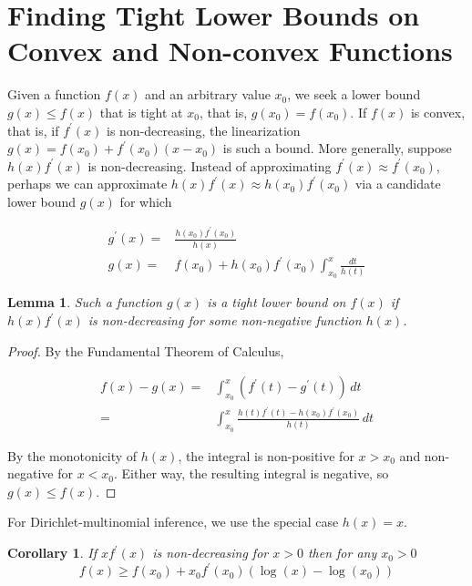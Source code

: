 \documentclass[nofootinbib,amssymb,amsmath]{revtex4}
\newtheorem{lemma}{Lemma}
\newtheorem{corollary}{Corollary}
\begin{document}
\section{Finding Tight Lower Bounds on Convex and Non-convex Functions} \label{bounds}

Given a function $f(x)$ and an arbitrary value $x_0$, we seek a lower bound $g(x) \le f(x)$ that is tight at $x_0$, that is, $g(x_0) = f(x_0)$.  If $f(x)$ is convex, that is, if $f^\prime(x)$ is non-decreasing, the linearization $g(x) = f(x_0) + f^\prime(x_0)(x-x_0)$ is such a bound.  More generally, suppose $h(x) f^\prime(x)$ is non-decreasing.  Instead of approximating $f^\prime(x) \approx f^\prime(x_0)$, perhaps we can approximate $h(x) f^\prime(x) \approx h(x_0) f^\prime(x_0)$ via a candidate lower bound $g(x)$ for which

\begin{align}
g^\prime(x) =& \frac{ h(x_0) f^\prime(x_0) } {h(x)} \\
g(x) =& f(x_0) + h(x_0) f^\prime(x_0)  \int_{x_0}^x \frac{d t}{h(t)}
\end{align}

\begin{lemma}
Such a function $g(x)$ is a tight lower bound on $f(x)$ if $h(x) f^\prime(x)$ is non-decreasing for some non-negative function $h(x)$.
\end{lemma}

\begin{proof}
By the Fundamental Theorem of Calculus,

\begin{align}
f(x) - g(x) =& \int_{x_0}^{x} \left( f^\prime(t) - g^\prime(t) \right) \, dt \\
=&  \int_{x_0}^{x} \frac{ h(t) f^\prime(t) - h(x_0) f^\prime(x_0) } {h(t)} \, dt
\end{align}

By the monotonicity of $h(x)$, the integral is non-positive for $x > x_0$ and non-negative for $x < x_0$.  Either way, the resulting integral is negative, so $g(x) \le f(x)$.
\end{proof}

For Dirichlet-multinomial inference, we use the special case $h(x) = x$.

\begin{corollary} 
If $x f^\prime(x)$ is non-decreasing for $x > 0$ then for any $x_0 > 0$
\begin{equation}
f(x) \ge f(x_0) + x_0 f^\prime(x_0) \left( \log(x) - \log(x_0) \right)
\end{equation}
\end{corollary}
\end{document}
